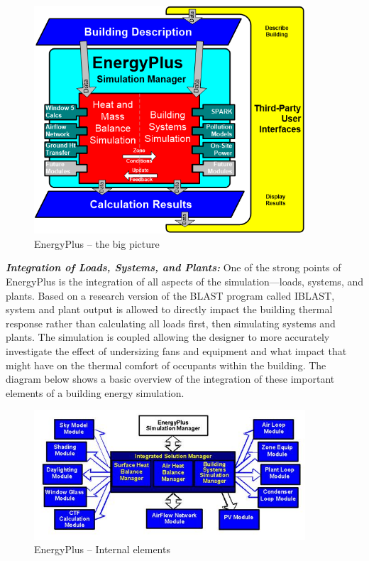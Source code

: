 \begin{figure}[hbtp] %
\centering
\includegraphics[width=0.9\textwidth, height=0.9\textheight, keepaspectratio=true]{media/image001.png}
\caption{EnergyPlus -- the big picture \protect \label{fig:energyplus-the-big-picture}}
\end{figure}

\textbf{\emph{Integration of Loads, Systems, and Plants:}} One of the strong points of EnergyPlus is the integration of all aspects of the simulation---loads, systems, and plants. Based on a research version of the BLAST program called IBLAST, system and plant output is allowed to directly impact the building thermal response rather than calculating all loads first, then simulating systems and plants. The simulation is coupled allowing the designer to more accurately investigate the effect of undersizing fans and equipment and what impact that might have on the thermal comfort of occupants within the building. The diagram below shows a basic overview of the integration of these important elements of a building energy simulation.

\begin{figure}[hbtp] %
\centering
\includegraphics[width=0.9\textwidth, height=0.9\textheight, keepaspectratio=true]{media/image002.jpg}
\caption{EnergyPlus -- Internal elements \protect \label{fig:energyplus-internal-elements}}
\end{figure}


